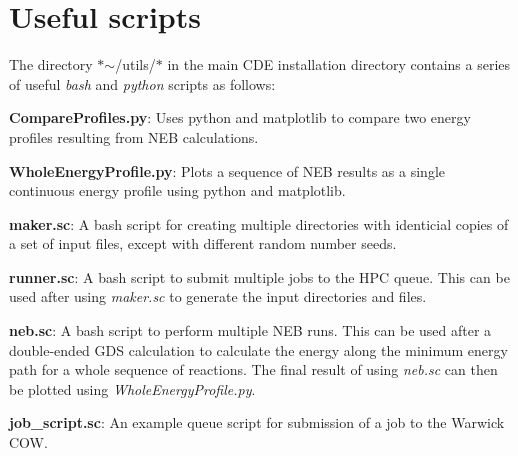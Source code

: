 \chapter{Useful scripts }
\hypertarget{scripts}{}\label{scripts}
\label{scripts_md_utils_2scripts}%
%


The directory \texorpdfstring{$\ast$}{*}\texorpdfstring{$\sim$}{\string~}/\+utils/\+\texorpdfstring{$\ast$}{*} in the main CDE installation directory contains a series of useful {\itshape bash} and {\itshape python} scripts as follows:


\begin{DoxyItemize}
\item {\bfseries{Compare\+Profiles.\+py}}: Uses python and matplotlib to compare two energy profiles resulting from NEB calculations.
\item {\bfseries{Whole\+Energy\+Profile.\+py}}: Plots a sequence of NEB results as a single continuous energy profile using python and matplotlib.
\item {\bfseries{maker.\+sc}}: A bash script for creating multiple directories with identicial copies of a set of input files, except with different random number seeds.
\item {\bfseries{runner.\+sc}}: A bash script to submit multiple jobs to the HPC queue. This can be used after using {\itshape maker.\+sc} to generate the input directories and files.
\item {\bfseries{neb.\+sc}}: A bash script to perform multiple NEB runs. This can be used after a double-\/ended GDS calculation to calculate the energy along the minimum energy path for a whole sequence of reactions. The final result of using {\itshape neb.\+sc} can then be plotted using {\itshape Whole\+Energy\+Profile.\+py}.
\item {\bfseries{job\+\_\+script.\+sc}}: An example queue script for submission of a job to the Warwick COW. 
\end{DoxyItemize}